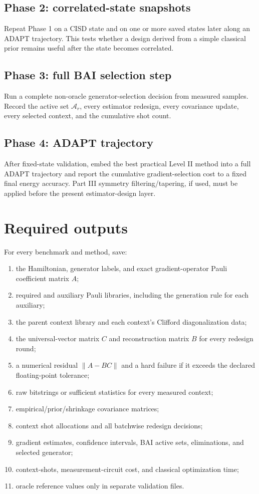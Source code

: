\documentclass[11pt]{article}
\newcommand{\Aset}{\mathcal A}
\begin{document}
\subsection{Phase 2: correlated-state snapshots}
Repeat Phase 1 on a CISD state and on one or more saved states later along an ADAPT trajectory.  This tests whether a design derived from a simple classical prior remains useful after the state becomes correlated.

\subsection{Phase 3: full BAI selection step}
Run a complete non-oracle generator-selection decision from measured samples.  Record the active set $\Aset_r$, every estimator redesign, every covariance update, every selected context, and the cumulative shot count.

\subsection{Phase 4: ADAPT trajectory}
After fixed-state validation, embed the best practical Level II method into a full ADAPT trajectory and report the cumulative gradient-selection cost to a fixed final energy accuracy.  Part III symmetry filtering/tapering, if used, must be applied before the present estimator-design layer.

\section{Required outputs}

For every benchmark and method, save:
\begin{enumerate}[label=(\roman*)]
  \item the Hamiltonian, generator labels, and exact gradient-operator Pauli coefficient matrix $A$;
  \item required and auxiliary Pauli libraries, including the generation rule for each auxiliary;
  \item the parent context library and each context's Clifford diagonalization data;
  \item the universal-vector matrix $C$ and reconstruction matrix $B$ for every redesign round;
  \item a numerical residual $\|A-BC\|$ and a hard failure if it exceeds the declared floating-point tolerance;
  \item raw bitstrings or sufficient statistics for every measured context;
  \item empirical/prior/shrinkage covariance matrices;
  \item context shot allocations and all batchwise redesign decisions;
  \item gradient estimates, confidence intervals, BAI active sets, eliminations, and selected generator;
  \item context-shots, measurement-circuit cost, and classical optimization time;
  \item oracle reference values only in separate validation files.
\end{enumerate}
\end{document}
